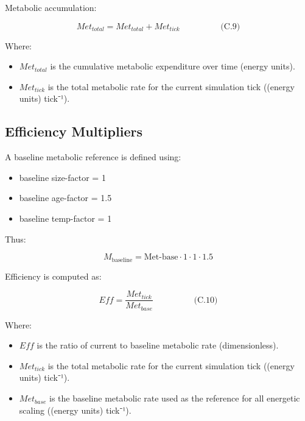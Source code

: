 \documentclass[
]{book}
\providecommand{\tightlist}{%
  \setlength{\itemsep}{0pt}\setlength{\parskip}{0pt}}
\begin{document}
Metabolic accumulation:

\[
\begin{equation} Met_{total} = Met_{total} + Met_{tick}  \hspace{2cm} \text{(C.9)} \end{equation}
\]

Where:

\begin{itemize}
\item
  \(Met_{total}\) is the cumulative metabolic expenditure over time
  (energy units).
\item
  \(Met_{tick}\) is the total metabolic rate for the current simulation
  tick ((energy units) tick⁻¹).
\end{itemize}

\subsection{Efficiency Multipliers}\label{efficiency-multipliers}

A baseline metabolic reference is defined using:

\begin{itemize}
\tightlist
\item
  baseline size-factor = 1\\
\item
  baseline age-factor = 1.5\\
\item
  baseline temp-factor = 1
\end{itemize}

Thus:

\[
M_{\text{baseline}} =
\text{Met-base} \cdot 1 \cdot 1 \cdot 1.5
\]

Efficiency is computed as:

\[
\begin{equation} Eff = 
\frac{Met_{tick}}{Met_{base}}  \hspace{2cm} \text{(C.10)} \end{equation}
\]

Where:

\begin{itemize}
\item
  \(Eff\) is the ratio of current to baseline metabolic rate
  (dimensionless).
\item
  \(Met_{tick}\) is the total metabolic rate for the current simulation
  tick ((energy units) tick⁻¹).
\item
  \(Met_{base}\) is the baseline metabolic rate used as the reference
  for all energetic scaling ((energy units) tick⁻¹).
\end{itemize}
\end{document}
